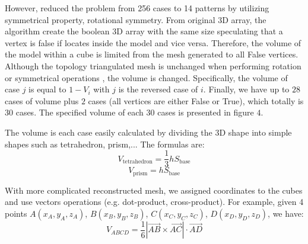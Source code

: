 \documentclass[11pt]{article}
\begin{document}
\begin{multicols}{2}
However, \cite{loren} reduced the problem from 256 cases to 14 patterns by utilizing symmetrical property, rotational symmetry. From original 3D array, the algorithm create the boolean 3D array with the same size speculating that a vertex is false if locates inside the model and vice versa. Therefore, the volume of the model within a cube is limited from the mesh generated to all False vertices. Although the topology triangulated mesh is unchanged when performing rotation or symmetrical operations \cite{loren}, the volume is changed. Specifically, the volume of case $j$ is equal to $1-V_i$ with $j$ is the reversed case of $i$. Finally, we have up to $28$ cases of volume plus $2$ cases (all vertices are either False or True), which totally is $30$ cases. The specified volume of each $30$ cases is presented in figure $4$.

The volume is each case easily calculated by dividing the 3D shape into simple shapes such as tetrahedron, prism,... The formulas are:
$$ V_{\text{tetrahedron}} = \frac{1}{3} h S_{\text{base}} $$
$$ V_{\text{prism}} = h S_{\text{base}} $$ 

With more complicated reconstructed mesh, we assigned coordinates to the cubes and use vectors operations (e.g. dot-product, cross-product). For example, given 4 points $A(x_A,y_A,z_A)$, $B(x_B,y_B,z_B)$, $C(x_C,y_C,z_C)$, $D(x_D,y_D,z_D)$, we have:
$$
V_{ABCD} = \frac{1}{6} |\Vec{AB} \times \Vec{AC}| \cdot \Vec{AD}
$$
\end{multicols}
\end{document}
